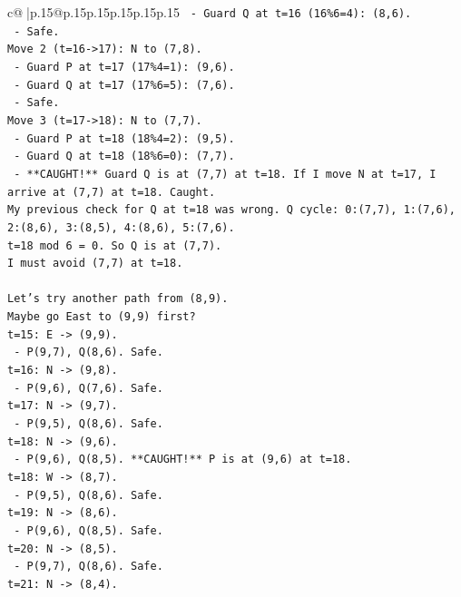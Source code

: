 \documentclass{article}
\begin{document}
{\begin{supertabular}{c@{$\;$}|p{.15\linewidth}@{}p{.15\linewidth}p{.15\linewidth}p{.15\linewidth}p{.15\linewidth}p{.15\linewidth}}
{{{\texttt{  {-} Guard Q at t=16 (16\%6=4): (8,6).} \\
\texttt{  {-} Safe.} \\
\texttt{Move 2 (t=16{-}>17): N to (7,8).} \\
\texttt{  {-} Guard P at t=17 (17\%4=1): (9,6).} \\
\texttt{  {-} Guard Q at t=17 (17\%6=5): (7,6).} \\
\texttt{  {-} Safe.} \\
\texttt{Move 3 (t=17{-}>18): N to (7,7).} \\
\texttt{  {-} Guard P at t=18 (18\%4=2): (9,5).} \\
\texttt{  {-} Guard Q at t=18 (18\%6=0): (7,7).} \\
\texttt{  {-} **CAUGHT!** Guard Q is at (7,7) at t=18. If I move N at t=17, I arrive at (7,7) at t=18. Caught.} \\
\texttt{My previous check for Q at t=18 was wrong. Q cycle: 0:(7,7), 1:(7,6), 2:(8,6), 3:(8,5), 4:(8,6), 5:(7,6).} \\
\texttt{t=18 mod 6 = 0. So Q is at (7,7).} \\
\texttt{I must avoid (7,7) at t=18.} \\
\\ 
\texttt{Let's try another path from (8,9).} \\
\texttt{Maybe go East to (9,9) first?} \\
\texttt{t=15: E {-}> (9,9).} \\
\texttt{  {-} P(9,7), Q(8,6). Safe.} \\
\texttt{t=16: N {-}> (9,8).} \\
\texttt{  {-} P(9,6), Q(7,6). Safe.} \\
\texttt{t=17: N {-}> (9,7).} \\
\texttt{  {-} P(9,5), Q(8,6). Safe.} \\
\texttt{t=18: N {-}> (9,6).} \\
\texttt{  {-} P(9,6), Q(8,5). **CAUGHT!** P is at (9,6) at t=18.} \\
\texttt{t=18: W {-}> (8,7).} \\
\texttt{  {-} P(9,5), Q(8,6). Safe.} \\
\texttt{t=19: N {-}> (8,6).} \\
\texttt{  {-} P(9,6), Q(8,5). Safe.} \\
\texttt{t=20: N {-}> (8,5).} \\
\texttt{  {-} P(9,7), Q(8,6). Safe.} \\
\texttt{t=21: N {-}> (8,4).} \\
}}}
\end{supertabular}}
\end{document}
